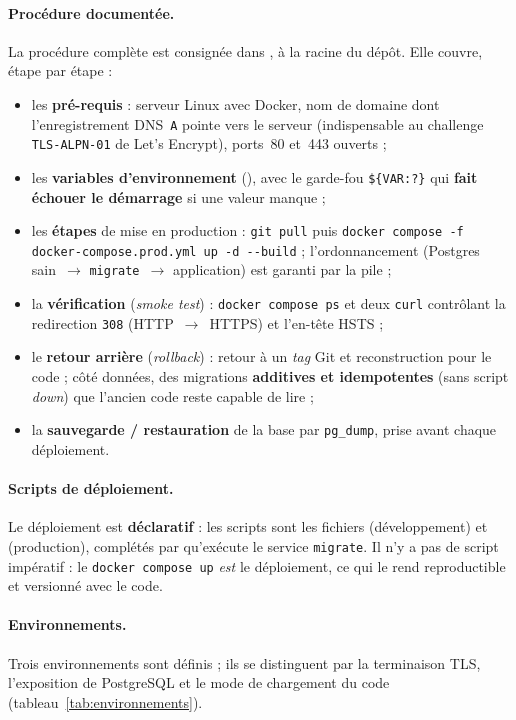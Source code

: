\paragraph{Procédure documentée.} La procédure complète est consignée dans ,
à la racine du dépôt. Elle couvre, étape par étape :
\begin{itemize}
  \item les \textbf{pré-requis} : serveur Linux avec Docker, nom de domaine dont l'enregistrement
        DNS~\texttt{A} pointe vers le serveur (indispensable au challenge \texttt{TLS-ALPN-01} de
        Let's Encrypt), ports~80 et~443 ouverts ;
  \item les \textbf{variables d'environnement} (), avec le garde-fou
        \texttt{\$\{VAR:?\}} qui \textbf{fait échouer le démarrage} si une valeur manque ;
  \item les \textbf{étapes} de mise en production : \texttt{git pull} puis
        \texttt{docker compose -f docker-compose.prod.yml up -d -{}-build} ; l'ordonnancement
        (Postgres sain~$\to$ \texttt{migrate}~$\to$ application) est garanti par la pile ;
  \item la \textbf{vérification} (\emph{smoke test}) : \texttt{docker compose ps} et deux
        \texttt{curl} contrôlant la redirection \texttt{308} (HTTP~$\to$~HTTPS) et l'en-tête HSTS ;
  \item le \textbf{retour arrière} (\emph{rollback}) : retour à un \emph{tag} Git et
        reconstruction pour le code ; côté données, des migrations \textbf{additives et
        idempotentes} (sans script \emph{down}) que l'ancien code reste capable de lire ;
  \item la \textbf{sauvegarde / restauration} de la base par \texttt{pg\_dump}, prise avant chaque
        déploiement.
\end{itemize}

\paragraph{Scripts de déploiement.} Le déploiement est \textbf{déclaratif} : les scripts sont les
fichiers  (développement) et  (production),
complétés par  qu'exécute le service \texttt{migrate}. Il n'y a pas de script
impératif  : le \texttt{docker compose up} \emph{est} le déploiement, ce qui le
rend reproductible et versionné avec le code.

\paragraph{Environnements.} Trois environnements sont définis ; ils se distinguent par la
terminaison TLS, l'exposition de PostgreSQL et le mode de chargement du code
(tableau~\ref{tab:environnements}).

